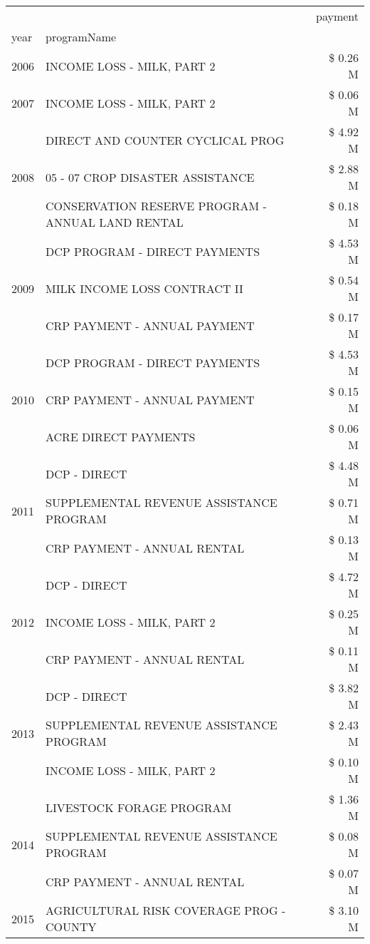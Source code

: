 \begin{tabular}{llr}
\toprule
 &  & payment \\
year & programName &  \\
\midrule
2006 & INCOME LOSS - MILK, PART 2 & \$ 0.26 M \\
\cline{1-3}
2007 & INCOME LOSS - MILK, PART 2 & \$ 0.06 M \\
\cline{1-3}
\multirow[t]{3}{*}{2008} & DIRECT AND COUNTER CYCLICAL PROG & \$ 4.92 M \\
 & 05 - 07 CROP DISASTER ASSISTANCE & \$ 2.88 M \\
 & CONSERVATION RESERVE PROGRAM - ANNUAL LAND RENTAL & \$ 0.18 M \\
\cline{1-3}
\multirow[t]{3}{*}{2009} & DCP PROGRAM - DIRECT PAYMENTS & \$ 4.53 M \\
 & MILK INCOME LOSS CONTRACT II & \$ 0.54 M \\
 & CRP PAYMENT - ANNUAL PAYMENT & \$ 0.17 M \\
\cline{1-3}
\multirow[t]{3}{*}{2010} & DCP PROGRAM - DIRECT PAYMENTS & \$ 4.53 M \\
 & CRP PAYMENT - ANNUAL PAYMENT & \$ 0.15 M \\
 & ACRE DIRECT PAYMENTS & \$ 0.06 M \\
\cline{1-3}
\multirow[t]{3}{*}{2011} & DCP - DIRECT & \$ 4.48 M \\
 & SUPPLEMENTAL REVENUE ASSISTANCE PROGRAM & \$ 0.71 M \\
 & CRP PAYMENT - ANNUAL RENTAL & \$ 0.13 M \\
\cline{1-3}
\multirow[t]{3}{*}{2012} & DCP - DIRECT & \$ 4.72 M \\
 & INCOME LOSS - MILK, PART 2 & \$ 0.25 M \\
 & CRP PAYMENT - ANNUAL RENTAL & \$ 0.11 M \\
\cline{1-3}
\multirow[t]{3}{*}{2013} & DCP - DIRECT & \$ 3.82 M \\
 & SUPPLEMENTAL REVENUE ASSISTANCE PROGRAM & \$ 2.43 M \\
 & INCOME LOSS - MILK, PART 2 & \$ 0.10 M \\
\cline{1-3}
\multirow[t]{3}{*}{2014} & LIVESTOCK FORAGE PROGRAM & \$ 1.36 M \\
 & SUPPLEMENTAL REVENUE ASSISTANCE PROGRAM & \$ 0.08 M \\
 & CRP PAYMENT - ANNUAL RENTAL & \$ 0.07 M \\
\cline{1-3}
\multirow[t]{3}{*}{2015} & AGRICULTURAL RISK COVERAGE PROG - COUNTY & \$ 3.10 M \\

\end{tabular}
